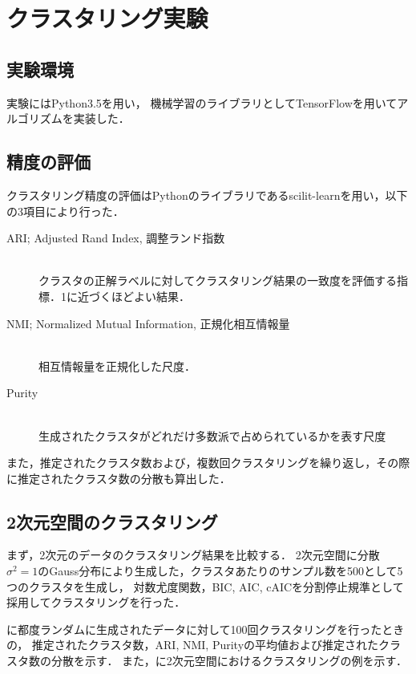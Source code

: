 \section{クラスタリング実験}

\subsection{実験環境}
実験にはPython3.5を用い，
機械学習のライブラリとしてTensorFlowを用いてアルゴリズムを実装した．

\subsection{精度の評価}
クラスタリング精度の評価はPythonのライブラリであるscilit-learnを用い，以下の3項目により行った．
\begin{description}
  \item[ARI; Adjusted Rand Index, 調整ランド指数]~\\
    クラスタの正解ラベルに対してクラスタリング結果の一致度を評価する指標．1に近づくほどよい結果．
  \item[NMI; Normalized Mutual Information, 正規化相互情報量]~\\
    相互情報量を正規化した尺度．
  \item[Purity]~\\
    生成されたクラスタがどれだけ多数派で占められているかを表す尺度
\end{description}

また，推定されたクラスタ数および，複数回クラスタリングを繰り返し，その際に推定されたクラスタ数の分散も算出した．

\subsection{2次元空間のクラスタリング}

まず，2次元のデータのクラスタリング結果を比較する．
2次元空間に分散$\sigma^2=1$のGauss分布により生成した，クラスタあたりのサンプル数を500として5つのクラスタを生成し，
対数尤度関数，BIC, AIC, cAICを分割停止規準として採用してクラスタリングを行った．

に都度ランダムに生成されたデータに対して100回クラスタリングを行ったときの，
推定されたクラスタ数，ARI, NMI, Purityの平均値および推定されたクラスタ数の分散を示す．
また，に2次元空間におけるクラスタリングの例を示す．

